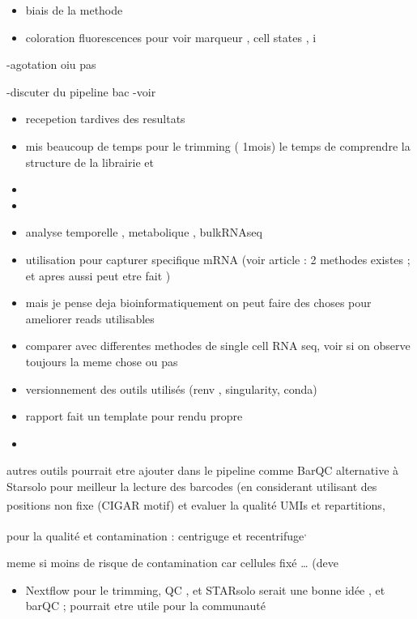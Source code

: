 \documentclass[
  11pt,
  a4paper,
]{report}
\providecommand{\tightlist}{%
  \setlength{\itemsep}{0pt}\setlength{\parskip}{0pt}}\usepackage{longtable,booktabs,array}
\begin{document}
\begin{itemize}
\tightlist
\item
  biais de la methode
\item
  coloration fluorescences pour voir marqueur , cell states , i
\end{itemize}

-agotation oiu pas

-discuter du pipeline bac -voir

\begin{itemize}
\item
  recepetion tardives des resultats
\item
  mis beaucoup de temps pour le trimming ( 1mois) le temps de comprendre
  la structure de la librairie et
\item
\item
\item
  analyse temporelle , metabolique , bulkRNAseq
\item
  utilisation pour capturer specifique mRNA (voir article : 2 methodes
  existes ; et apres aussi peut etre fait )
\item
  mais je pense deja bioinformatiquement on peut faire des choses pour
  ameliorer reads utilisables
\item
  comparer avec differentes methodes de single cell RNA seq, voir si on
  observe toujours la meme chose ou pas
\item
  versionnement des outils utilisés (renv , singularity, conda)
\item
  rapport fait un template pour rendu propre
\item
\end{itemize}

autres outils pourrait etre ajouter dans le pipeline comme BarQC
alternative à Starsolo pour meilleur la lecture des barcodes (en
considerant utilisant des positions non fixe (CIGAR motif) et evaluer la
qualité UMIs et
repartitions\textsuperscript{},

pour la qualité et contamination : centriguge et
recentrifuge\textsuperscript{,}

meme si moins de risque de contamination car cellules fixé \ldots{}
(deve

\begin{itemize}
\tightlist
\item
  Nextflow pour le trimming, QC , et STARsolo serait une bonne idée , et
  barQC ; pourrait etre utile pour la communauté
\end{itemize}
\end{document}
